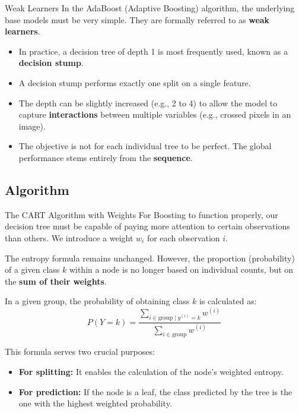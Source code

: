 \begin{frame}{Weak Learners}
	In the AdaBoost (Adaptive Boosting) algorithm, the underlying base models must be very simple. They are formally referred to as \textbf{weak learners}.
	\begin{itemize}
		\item In practice, a decision tree of depth 1 is most frequently used, known as a \textbf{decision stump}.
		\pause
		\item A decision stump performs exactly one split on a single feature.
		\pause
		\item The depth can be slightly increased (e.g., 2 to 4) to allow the model to capture \textbf{interactions} between multiple variables (e.g., crossed pixels in an image).
		\pause
		\item The objective is not for each individual tree to be perfect. The global performance stems entirely from the \textbf{sequence}.
	\end{itemize}
\end{frame}

\subsection[Algorithm]{Algorithm}

\begin{frame}{The CART Algorithm with Weights}
	For Boosting to function properly, our decision tree must be capable of paying more attention to certain observations than others. We introduce a weight $w_i$ for each observation $i$.
	
	\vspace{0.3cm}
	The entropy formula remains unchanged. However, the proportion (probability) of a given class $k$ within a node is no longer based on individual counts, but on the \textbf{sum of their weights}.
	
	\pause
	\vspace{0.3cm}
	
	In a given group, the probability of obtaining class $k$ is calculated as:
	\begin{equation*}
		P(Y = k) = \frac{\sum_{i \in \text{group} \mid y^{(i)} = k} w^{(i)}}{\sum_{i \in \text{group}} w^{(i)}}
	\end{equation*}
	
	\pause
	
	This formula serves two crucial purposes:
	\begin{itemize}
		\item \textbf{For splitting:} It enables the calculation of the node's weighted entropy.
		\item \textbf{For prediction:} If the node is a leaf, the class predicted by the tree is the one with the highest weighted probability.
	\end{itemize}
\end{frame}


